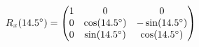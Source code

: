 \documentclass[preview]{standalone}
\begin{document}
\begin{align*}
\special{dvisvgm:raw <g id='unique000'>}R_x(14.5^\circ) = \begin{pmatrix} 1 & 0 & 0 \\ 0 & \cos(14.5^\circ) & -\sin(14.5^\circ) \\ 0 & \sin(14.5^\circ) & \cos(14.5^\circ) \end{pmatrix}\special{dvisvgm:raw </g>}
\end{align*}
\end{document}
